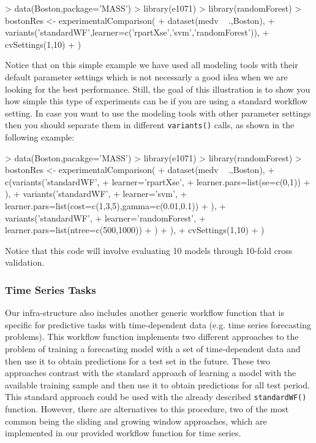 \documentclass[10pt,a4paper]{article}
\begin{document}
\begin{Schunk}
\begin{Sinput}
> data(Boston,package='MASS')
> library(e1071)
> library(randomForest)
> bostonRes <- experimentalComparison(
+   dataset(medv ~ .,Boston),
+   variants('standardWF',learner=c('rpartXse','svm','randomForest')),
+   cvSettings(1,10)
+   )
\end{Sinput}
\end{Schunk}

Notice that on this simple example we have used all modeling tools
with their default parameter settings which is not necessarly a good
idea when we are looking for the best performance. Still, the goal of
this illustration is to show you how simple this type of experiments
can be if you are using a standard workflow setting. In case you want
to use the modeling tools with other parameter settings then you
should separate them in different \texttt{variants()} calls, as shown
in the following example:

\begin{Schunk}
\begin{Sinput}
> data(Boston,pacakge='MASS')
> library(e1071)
> library(randomForest)
> bostonRes <- experimentalComparison(
+   dataset(medv ~ .,Boston),
+   c(variants('standardWF',
+              learner='rpartXse',
+              learner.pars=list(se=c(0,1))
+             ),
+     variants('standardWF',
+              learner='svm',
+              learner.pars=list(cost=c(1,3,5),gamma=c(0.01,0.1))
+             ),
+     variants('standardWF',
+              learner='randomForest',
+              learner.pars=list(ntree=c(500,1000))
+             )
+     ),
+   cvSettings(1,10)
+   )
\end{Sinput}
\end{Schunk}

Notice that this code will involve evaluating 10 models through
10-fold cross validation. 


\subsubsection{Time Series Tasks}

Our infra-structure also includes another generic workflow function
that is specific for predictive tasks with time-dependent data
(e.g. time series forecasting problems). This workflow function
implements two different approaches to the problem of training a
forecasting model with a set of time-dependent data and then use it to
obtain predictions for a test set in the future. These two approaches
contrast with the standard approach of learning a model with the
available training sample and then use it to obtain predictions for
all test period. This standard approach could be used with the already
described \texttt{standardWF()} function. However, there are
alternatives to this procedure, two of the most common being the
sliding and growing window approaches, which are implemented in our
provided workflow function for time series.
\end{document}
